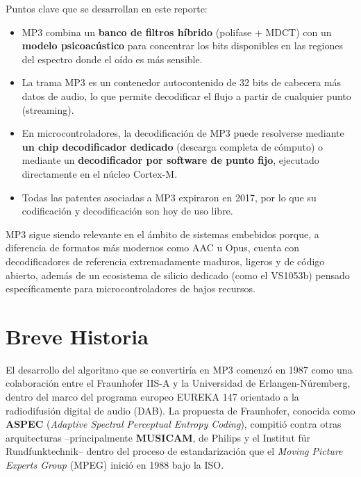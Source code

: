 \documentclass[pdflatex,sn-mathphys-num]{sn-jnl}%
\begin{document}
Puntos clave que se desarrollan en este reporte:
\begin{itemize}
    \item MP3 combina un \textbf{banco de filtros híbrido} (polifase + MDCT) con un \textbf{modelo psicoacústico} para concentrar los bits disponibles en las regiones del espectro donde el oído es más sensible.
    \item La trama MP3 es un contenedor autocontenido de 32 bits de cabecera más datos de audio, lo que permite decodificar el flujo a partir de cualquier punto (streaming).
    \item En microcontroladores, la decodificación de MP3 puede resolverse mediante \textbf{un chip decodificador dedicado} (descarga completa de cómputo) o mediante un \textbf{decodificador por software de punto fijo}, ejecutado directamente en el núcleo Cortex-M.
    \item Todas las patentes asociadas a MP3 expiraron en 2017, por lo que su codificación y decodificación son hoy de uso libre.
\end{itemize}

MP3 sigue siendo relevante en el ámbito de sistemas embebidos porque, a diferencia de formatos más modernos como AAC u Opus, cuenta con decodificadores de referencia extremadamente maduros, ligeros y de código abierto, además de un ecosistema de silicio dedicado (como el VS1053b) pensado específicamente para microcontroladores de bajos recursos.

\section{Breve Historia}\label{sec:history}
El desarrollo del algoritmo que se convertiría en MP3 comenzó en 1987 como una colaboración entre el Fraunhofer IIS-A y la Universidad de Erlangen-Núremberg, dentro del marco del programa europeo EUREKA 147 orientado a la radiodifusión digital de audio (DAB). La propuesta de Fraunhofer, conocida como \textbf{ASPEC} (\textit{Adaptive Spectral Perceptual Entropy Coding}), compitió contra otras arquitecturas --principalmente \textbf{MUSICAM}, de Philips y el Institut für Rundfunktechnik-- dentro del proceso de estandarización que el \textit{Moving Picture Experts Group} (MPEG) inició en 1988 bajo la ISO.
\end{document}
